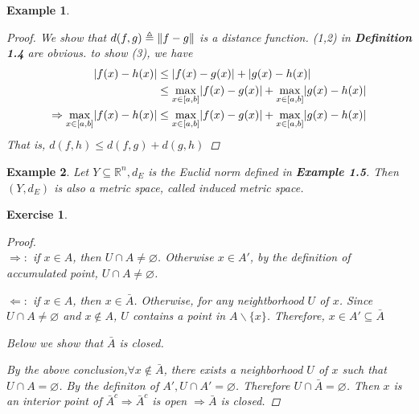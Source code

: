 \documentclass{article}
\DeclarePairedDelimiter\norm{\lVert}{\rVert}
\DeclarePairedDelimiter\abs{\lvert}{\rvert}
\def\emptyset{\varnothing}
\newtheorem{example}{Example}[section] %
\newtheorem{exercise}{Exercise}[section]
\begin{document}
\begin{example}
\begin{proof}
We show that $d(f,g)\triangleq \norm{f-g}$ is a distance function.
(1,2) in \textbf{Definition 1.4} are obvious. to show (3), we have
\begin{align*}
\abs{f(x)-h(x)} & \leq  \abs{f(x)-g(x)}+\abs{g(x)-h(x)}  \\
& \leq \max_{x\in[a,b]}\abs{f(x)-g(x)} + \max_{x\in[a,b]}\abs{g(x)-h(x)} \\
 \Rightarrow \max_{x\in[a,b]}\abs{f(x)-h(x)}& \leq \max_{x\in[a,b]}\abs{f(x)-g(x)} + \max_{x\in[a,b]}\abs{g(x)-h(x)}
\end{align*}
That is, $d(f,h)\leq d(f,g)+d(g,h)$ 
\end{proof}
\end{example}
\begin{example}
Let $Y \subseteq \mathbb{R}^n,d_E$ is the Euclid norm defined in \textnormal{\textbf{Example 1.5}}. Then $(Y,d_E)$ is also a metric space, called induced metric space.
\end{example}
\setcounter{exercise}{9}
\begin{exercise}
\begin{proof}
\quad\\
\indent $\Rightarrow:$ if $x\in A$, then $U \cap A \neq \emptyset$. Otherwise $x\in A'$, by the definition of accumulated point, $ U \cap A \neq \emptyset$.

$\Leftarrow:$ if $x\in A$, then $x\in \bar{A}$. Otherwise, for any neightborhood $U$ of $x$. Since $U\cap A\neq \emptyset$ and $x\notin A$, $U$ contains a point in  $A\backslash \{x\}$. Therefore, $x\in A'\subseteq \bar{A}$

Below we show that $\bar{A}$ is closed. 

By the above conclusion,$\forall x\notin \bar{A}$, there exists a neighborhood $U$ of $x$ such that $U\cap A = \emptyset$. By the definiton of $A',U\cap A' 
= \emptyset$. Therefore $U\cap \bar{A}=\emptyset$. Then $x$ is an interior point of $\bar{A}^c \Rightarrow \bar{A}^c$ is open $\Rightarrow \bar{A}$ is closed.
\end{proof}
\end{exercise}
\end{document}
